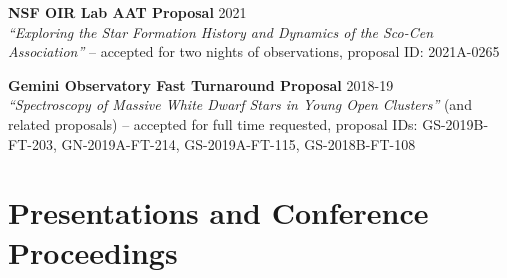 \documentclass[12pt,a4paper,sans,xetex]{moderncv}        %
\begin{document}
\textbf{NSF OIR Lab AAT Proposal} \hfill 2021 \\ \textit{``Exploring the Star Formation History and Dynamics of the Sco-Cen Association''} -- accepted for two nights of observations, proposal ID: 2021A-0265

\textbf{Gemini Observatory Fast Turnaround Proposal} \hfill 2018-19 \\
\textit{``Spectroscopy of Massive White Dwarf Stars in Young Open Clusters''} (and related proposals) -- accepted for full time requested, proposal IDs: GS-2019B-FT-203, GN-2019A-FT-214, GS-2019A-FT-115, GS-2018B-FT-108

\vspace{-1em}

\section{Presentations and Conference Proceedings}

\vspace{-0.5em}

\vspace{3pt}
\end{document}
